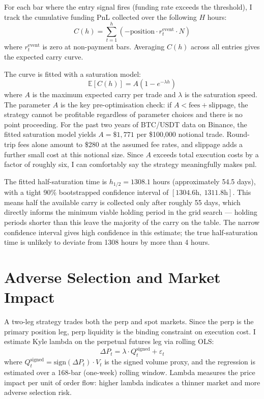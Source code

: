 \documentclass[11pt,a4paper]{article}
\begin{document}
For each bar where the entry signal fires (funding rate exceeds the
threshold), I track the cumulative funding PnL collected over the following
$H$ hours:
\[
    C(h) = \sum_{t=1}^{h} \left( -\text{position} \cdot r_t^{\text{event}}
    \cdot N \right)
\]
where $r_t^{\text{event}}$ is zero at non-payment bars. Averaging $C(h)$
across all entries gives the expected carry curve.

The curve is fitted with a saturation model:
\[
    \mathbb{E}[C(h)] = A \left(1 - e^{-\lambda h}\right)
\]
where $A$ is the maximum expected carry per trade and $\lambda$ is the
saturation speed. The parameter $A$ is the key pre-optimisation check:
if $A < \text{fees} + \text{slippage}$, the strategy cannot be profitable
regardless of parameter choices and there is no point proceeding. For the past two years of BTC/USDT data on Binance, the fitted saturation 
model yields $A = \$1{,}771$ per \$100{,}000 notional trade. Round-trip 
fees alone amount to \$280 at the assumed fee rates, and slippage adds a 
further small cost at this notional size. Since $A$ exceeds total execution 
costs by a factor of roughly six, I can comfortably say the strategy meaningfully makes pnl.

The fitted half-saturation time is $h_{1/2} = 1308.1$ hours (approximately 
54.5 days), with a tight 90\% bootstrapped confidence interval of 
$[1304.6\text{h},\ 1311.8\text{h}]$. This means half the available carry 
is collected only after roughly 55 days, which directly informs the minimum 
viable holding period in the grid search --- holding periods shorter than 
this leave the majority of the carry on the table. The narrow confidence 
interval gives high confidence in this estimate; the true half-saturation 
time is unlikely to deviate from 1308 hours by more than 4 hours.

\section{Adverse Selection and Market Impact}

A two-leg strategy trades both the perp and spot markets. Since the 
perp is the primary position leg, perp liquidity is the binding 
constraint on execution cost. I estimate Kyle lambda on the 
perpetual futures leg via rolling OLS:
\[
    \Delta P_t = \lambda \cdot Q_t^{\text{signed}} + \varepsilon_t
\]
where $Q_t^{\text{signed}} = \text{sign}(\Delta P_t) \cdot V_t$ is the
signed volume proxy, and the regression is estimated over a 168-bar
(one-week) rolling window. Lambda measures the price impact per unit of
order flow: higher lambda indicates a thinner market and more adverse
selection risk.
\end{document}
